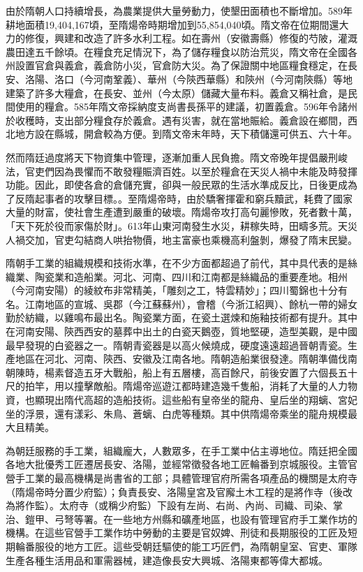 由於隋朝人口持續增長，為農業提供大量勞動力，使墾田面積也不斷增加。589年耕地面積19,404,167頃，至隋煬帝時期增加到55,854,040頃。隋文帝在位期間還大力的修復，興建和改造了許多水利工程。如在壽州（安徽壽縣）修復的芍陂，灌溉農田達五千餘頃。在糧食充足情況下，為了儲存糧食以防治荒災，隋文帝在全國各州設置官倉與義倉，義倉防小災，官倉防大災。為了保證關中地區糧食穩定，在長安、洛陽、洛口（今河南鞏義）、華州（今陝西華縣）和陝州（今河南陝縣）等地建築了許多大糧倉，在長安、並州（今太原）儲藏大量布料。義倉又稱社倉，是民間使用的糧倉。585年隋文帝採納度支尚書長孫平的建議，初置義倉。596年令諸州於收穫時，支出部分糧食存於義倉。遇有災害，就在當地賑給。義倉設在鄉間，西北地方設在縣城，開倉較為方便。到隋文帝末年時，天下積儲還可供五、六十年。

然而隋廷過度將天下物資集中管理，逐漸加重人民負擔。隋文帝晚年提倡嚴刑峻法，官吏們因為畏懼而不敢發糧賑濟百姓。以至於糧倉在天災人禍中未能及時發揮功能。因此，即使各倉的倉儲充實，卻與一般民眾的生活水準成反比，日後更成為了反隋起事者的攻擊目標。。至隋煬帝時，由於驕奢揮霍和窮兵黷武，耗費了國家大量的財富，使社會生產遭到嚴重的破壞。隋煬帝攻打高句麗慘敗，死者數十萬，「天下死於役而家傷於財」。613年山東河南發生水災，耕稼失時，田疇多荒。天災人禍交加，官吏勾結商人哄抬物價，地主富豪也乘機高利盤剝，爆發了隋末民變。

隋朝手工業的組織規模和技術水準，在不少方面都超過了前代，其中具代表的是絲織業、陶瓷業和造船業。河北、河南、四川和江南都是絲織品的重要產地。相州（今河南安陽）的綾紋布非常精美，「雕刻之工，特雲精妙」；四川蜀錦也十分有名。江南地區的宣城、吳郡（今江蘇蘇州），會稽（今浙江紹興）、餘杭一帶的婦女勤於紡織，以雞鳴布最出名。陶瓷業方面，在瓷土選煉和施釉技術都有提升。其中在河南安陽、陝西西安的墓葬中出土的白瓷天鵝壺，質地堅硬，造型美觀，是中國最早發現的白瓷器之一。隋朝青瓷器是以高火候燒成，硬度遠遠超過晉朝青瓷。生產地區在河北、河南、陝西、安徽及江南各地。隋朝造船業很發達。隋朝準備伐南朝陳時，楊素督造五牙大戰船，船上有五層樓，高百餘尺，前後安置了六個長五十尺的拍竿，用以撞擊敵船。隋煬帝巡遊江都時建造幾千隻船，消耗了大量的人力物資，也顯現出隋代高超的造船技術。這些船有皇帝坐的龍舟、皇后坐的翔螭、宮妃坐的浮景，還有漾彩、朱鳥、蒼螭、白虎等種類。其中供隋煬帝乘坐的龍舟規模最大且精美。

為朝廷服務的手工業，組織龐大，人數眾多，在手工業中佔主導地位。隋廷把全國各地大批優秀工匠遷居長安、洛陽，並經常徵發各地工匠輪番到京城服役。主管官營手工業的最高機構是尚書省的工部；具體管理官府所需各項產品的機關是太府寺（隋煬帝時分置少府監）；負責長安、洛陽皇宮及官廨土木工程的是將作寺（後改為將作監）。太府寺（或稱少府監）下設有左尚、右尚、內尚、司織、司染、掌治、鎧甲、弓弩等署。在一些地方州縣和礦產地區，也設有管理官府手工業作坊的機構。在這些官營手工業作坊中勞動的主要是官奴婢、刑徒和長期服役的工匠及短期輪番服役的地方工匠。這些受朝廷驅使的能工巧匠們，為隋朝皇室、官吏、軍隊生產各種生活用品和軍需器械，建造像長安大興城、洛陽東都等偉大都城。

